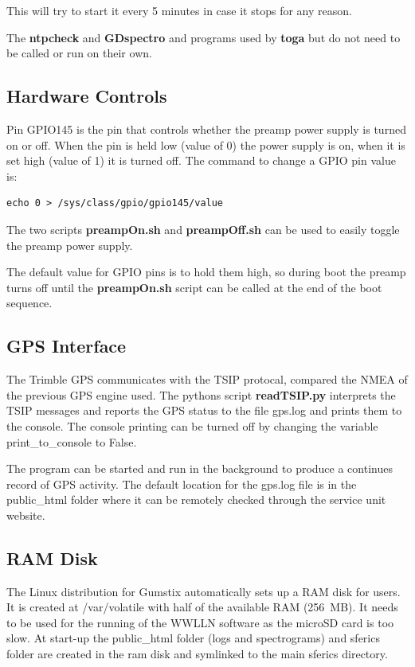 \documentclass[12pt, letterpaper, onecolumn, oneside]{article}
\begin{document}
This will try to start it every 5 minutes in case it stops for any reason.

The {\bf ntpcheck} and {\bf GDspectro} and programs used by {\bf toga} but do not need to be called or run on their own.

\subsection{Hardware Controls}

Pin GPIO145 is the pin that controls whether the preamp power supply is turned on or off.
When the pin is held low (value of 0) the power supply is on, when it is set high (value of 1) it is turned off.
The command to change a GPIO pin value is:

\begin{verbatim}
echo 0 > /sys/class/gpio/gpio145/value
\end{verbatim}

The two scripts {\bf preampOn.sh} and {\bf preampOff.sh} can be used to easily toggle the preamp power supply.

The default value for GPIO pins is to hold them high, so during boot the preamp turns off until the {\bf preampOn.sh} script can be called at the end of the boot sequence.

\subsection{GPS Interface}

The Trimble GPS communicates with the TSIP protocal, compared the NMEA of the previous GPS engine used.
The pythons script {\bf readTSIP.py} interprets the TSIP messages and reports the GPS status to the file gps.log and prints them to the console.
The console printing can be turned off by changing the variable print\_to\_console to False.

The program can be started and run in the background to produce a continues record of GPS activity.
The default location for the gps.log file is in the public\_html folder where it can be remotely checked through the service unit website.

\subsection{RAM Disk}

The Linux distribution for Gumstix automatically sets up a RAM disk for users.
It is created at /var/volatile with half of the available RAM (256~MB).
It needs to be used for the running of the WWLLN software as the microSD card is too slow.
At start-up the public\_html folder (logs and spectrograms) and sferics folder are created in the ram disk and symlinked to the main sferics directory.
\end{document}
